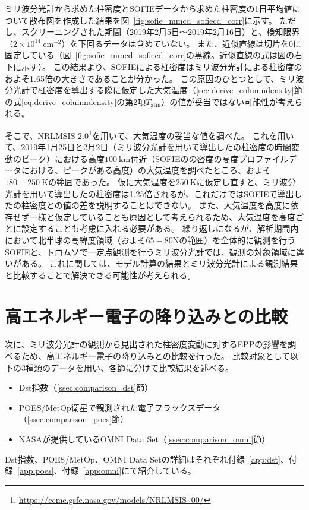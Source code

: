 ミリ波分光計から求めた柱密度とSOFIEデータから求めた柱密度の1日平均値について散布図を作成した結果を図~\ref{fig:sofie_mmcd_sofiecd_corr}に示す。
ただし、スクリーニングされた期間（2019年2月5日〜2019年2月16日）と、検知限界（$2\times 10^{14}\ \mathrm{cm^{-2}}$）を下回るデータは含めていない。
また、近似直線は切片を0に固定している（図~\ref{fig:sofie_mmcd_sofiecd_corr}の黒線。近似直線の式は図の右下に示す）。
この結果より、SOFIEによる柱密度はミリ波分光計による柱密度のおよそ1.65倍の大きさであることが分かった。
この原因のひとつとして、ミリ波分光計で柱密度を導出する際に仮定した大気温度（\ref{sec:derive_columndensity}節の式\eqref{eq:derive_columndensity}の第2項$T_{\mathrm{atm}}$）の値が妥当ではない可能性が考えられる。\par
そこで、NRLMSIS 2.0\footnote{\url{https://ccmc.gsfc.nasa.gov/models/NRLMSIS~00/}}を用いて、大気温度の妥当な値を調べた。
これを用いて、2019年1月25日と2月2日（ミリ波分光計を用いて導出したの柱密度の時間変動のピーク）における高度$100\ \mathrm{km}$付近（SOFIEのの密度の高度プロファイルデータにおける、ピークがある高度）の大気温度を調べたところ、およそ$180-250\ \mathrm{K}$の範囲であった。
仮に大気温度を$250\ \mathrm{K}$に仮定し直すと、ミリ波分光計を用いて導出したの柱密度は1.25倍されるが、これだけではSOFIEで導出したの柱密度との値の差を説明することはできない。
また、大気温度を高度に依存せず一様と仮定していることも原因として考えられるため、大気温度を高度ごとに設定することも考慮に入れる必要がある。
繰り返しになるが、解析期間内において北半球の高緯度領域（およそ$65 - 80$\textdegree Nの範囲）を全体的に観測を行うSOFIEと、トロムソで一定点観測を行うミリ波分光計では、観測の対象領域に違いがある。
これに関しては、モデル計算の結果とミリ波分光計による観測結果と比較することで解決できる可能性が考えられる。


\section{高エネルギー電子の降り込みとの比較}
\label{sec:comparison_eep}
次に、ミリ波分光計の観測から見出された柱密度変動に対するEPPの影響を調べるため、高エネルギー電子の降り込みとの比較を行った。
比較対象として以下の3種類のデータを用い、各節に分けて比較結果を述べる。
\begin{itemize}
    \item Dst指数（\ref{ssec:comparison_dst}節）
    \item POES/MetOp衛星で観測された電子フラックスデータ（\ref{ssec:comparison_poes}節）
    \item NASAが提供しているOMNI Data Set（\ref{ssec:comparison_omni}節）
\end{itemize} \par
Dst指数、POES/MetOp、OMNI Data Setの詳細はそれぞれ付録~\ref{app:dst}、付録~\ref{app:poes}、付録~\ref{app:omni}にて紹介している。


